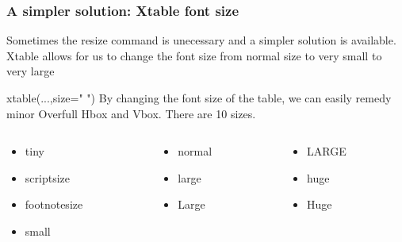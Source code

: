 \documentclass[nogin]{beamer}\usepackage[]{graphicx}\usepackage[]{color}
\begin{document}
\begin{frame}[fragile]
\frametitle{A simpler solution: Xtable font size}
Sometimes the resize command is unecessary and a simpler solution is available. Xtable allows for us to change the font size from normal size to {\tiny very small} to {\Large very large}
\begin{block}{xtable(...,size="  ")}
By changing the font size of the table, we can easily remedy minor Overfull Hbox and Vbox. There are 10 sizes.
\begin{columns}[T]
\begin{column}{.25\linewidth}
\begin{itemize}
\item {\tiny tiny}
\item {\scriptsize scriptsize}
\item {\footnotesize footnotesize}
\item {\small small}
\end{itemize}
\end{column}
\begin{column}{.25\linewidth}
\begin{itemize}
\item {\normalsize normal}
\item {\large large}
\item {\Large Large}
\end{itemize}
\end{column}
\begin{column}{.5\linewidth}
\begin{itemize}
\item {\LARGE LARGE}
\item {\huge huge}
\item {\Huge Huge}
\end{itemize}
\end{column}
\end{columns}
\end{block}
\end{frame}
\end{document}
